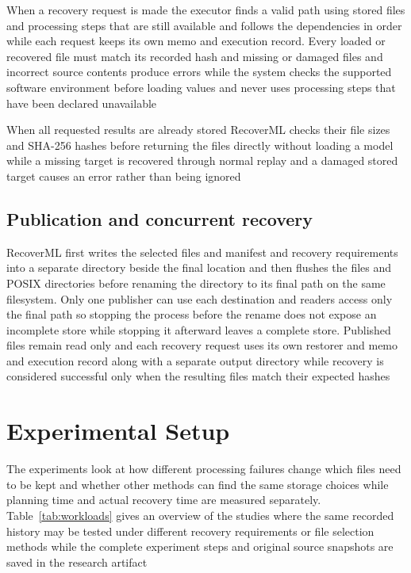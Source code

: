 When a recovery request is made the executor finds a valid path using stored files and processing steps that are still available and follows the dependencies in order while each request keeps its own memo and execution record. Every loaded or recovered file must match its recorded hash and missing or damaged files and incorrect source contents produce errors while the system checks the supported software environment before loading values and never uses processing steps that have been declared unavailable

When all requested results are already stored RecoverML checks their file sizes and SHA-256 hashes before returning the files directly without loading a model while a missing target is recovered through normal replay and a damaged stored target causes an error rather than being ignored

\subsection{Publication and concurrent recovery}

RecoverML first writes the selected files and manifest and recovery requirements into a separate directory beside the final location and then flushes the files and POSIX directories before renaming the directory to its final path on the same filesystem. Only one publisher can use each destination and readers access only the final path so stopping the process before the rename does not expose an incomplete store while stopping it afterward leaves a complete store. Published files remain read only and each recovery request uses its own restorer and memo and execution record along with a separate output directory while recovery is considered successful only when the resulting files match their expected hashes

\section{Experimental Setup}
\label{sec:experiments}

The experiments look at how different processing failures change which files need to be kept and whether other methods can find the same storage choices while planning time and actual recovery time are measured separately. Table~\ref{tab:workloads} gives an overview of the studies where the same recorded history may be tested under different recovery requirements or file selection methods while the complete experiment steps and original source snapshots are saved in the research artifact~\cite{artifact}

